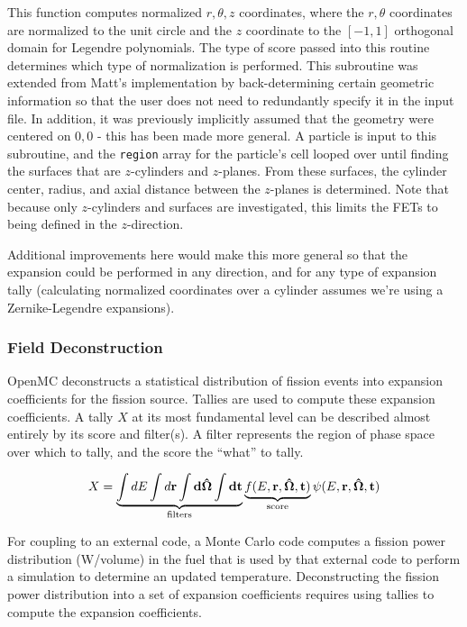 \documentclass[10pt]{article}
\newcommand{\beq}{\begin{equation}}
\newcommand{\eeq}{\end{equation}}
\newcounter{subsubsubsection}[subsubsection]
\numberwithin{equation}{section} %
\begin{document}
This function computes normalized \(r, \theta, z\) coordinates, where the \(r, \theta\) coordinates are normalized to the unit circle and the \(z\) coordinate to the \([-1, 1]\) orthogonal domain for Legendre polynomials. The type of score passed into this routine determines which type of normalization is performed. This subroutine was extended from Matt's implementation by back-determining certain geometric information so that the user does not need to redundantly specify it in the input file. In addition, it was previously implicitly assumed that the geometry were centered on \(0, 0\) - this has been made more general. A particle is input to this subroutine, and the {\tt region} array for the particle's cell looped over until finding the surfaces that are \(z\)-cylinders and \(z\)-planes. From these surfaces, the cylinder center, radius, and axial distance between the \(z\)-planes is determined. Note that because only \(z\)-cylinders and surfaces are investigated, this limits the FETs to being defined in the \(z\)-direction. 

\color{magenta}
Additional improvements here would make this more general so that the expansion could be performed in any direction, and for any type of expansion tally (calculating normalized coordinates over a cylinder assumes we're using a Zernike-Legendre expansions).
\color{black}

\subsubsection{Field Deconstruction}
OpenMC deconstructs a statistical distribution of fission events into expansion coefficients for the fission source. Tallies are used to compute these expansion coefficients. A tally \(X\) at its most fundamental level can be described almost entirely by its score and filter(s). A filter represents the region of phase space over which to tally, and the score the ``what'' to tally. 

\beq
X=\underbrace{\int dE\int d\bf{r}\int d\hat{\Omega}\int dt}_{\textrm{filters}} \underbrace{f(E,\bf{r},\hat{\Omega},t)}_{\textrm{score}}\psi(E,\bf{r},\hat{\Omega},t)
\eeq

For coupling to an external code, a Monte Carlo code computes a fission power distribution (W/volume) in the fuel that is used by that external code to perform a simulation to determine an updated temperature. Deconstructing the fission power distribution into a set of expansion coefficients requires using tallies to compute the expansion coefficients. 
\end{document}
